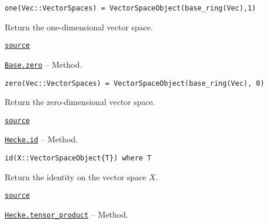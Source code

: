 \documentclass{memoir}
\begin{document}
\begin{adjustwidth}{2em}{0pt}


\begin{verbatim}
one(Vec::VectorSpaces) = VectorSpaceObject(base_ring(Vec),1)
\end{verbatim}

Return the one-dimensional vector space.



\href{https://github.com/FabianMaeurer/JuCat.jl/blob/367390e2d003deec2ababa73caeab405e934bb35/src/structures/VectorSpaces/VectorSpaces.jl#L141-L145}{\texttt{source}}


\end{adjustwidth}
\hypertarget{2429087325790184140}{} 
\hyperlink{2429087325790184140}{\texttt{Base.zero}}  -- {Method.}

\begin{adjustwidth}{2em}{0pt}


\begin{verbatim}
zero(Vec::VectorSpaces) = VectorSpaceObject(base_ring(Vec), 0)
\end{verbatim}

Return the zero-dimensional vector space.



\href{https://github.com/FabianMaeurer/JuCat.jl/blob/367390e2d003deec2ababa73caeab405e934bb35/src/structures/VectorSpaces/VectorSpaces.jl#L148-L152}{\texttt{source}}


\end{adjustwidth}
\hypertarget{3782291054861654459}{} 
\hyperlink{3782291054861654459}{\texttt{Hecke.id}}  -- {Method.}

\begin{adjustwidth}{2em}{0pt}


\begin{verbatim}
id(X::VectorSpaceObject{T}) where T
\end{verbatim}

Return the identity on the vector space \(X\).



\href{https://github.com/FabianMaeurer/JuCat.jl/blob/367390e2d003deec2ababa73caeab405e934bb35/src/structures/VectorSpaces/VectorSpaces.jl#L298-L302}{\texttt{source}}


\end{adjustwidth}
\hypertarget{9611467537333931590}{} 
\hyperlink{9611467537333931590}{\texttt{Hecke.tensor\_product}}  -- {Method.}
\end{document}
